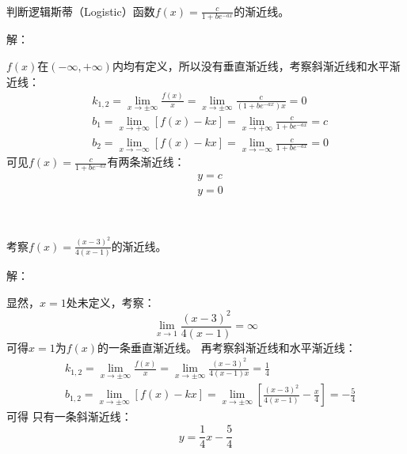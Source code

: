 ~

\begin{example}
判断逻辑斯蒂（Logistic）函数$f\left( x \right) =\frac{c}{1+be^{-ax}}$的渐近线。
\end{example}

解：

$f\left( x \right) $在$\left( -\infty ,+\infty \right) $内均有定义，所以没有垂直渐近线，考察斜渐近线和水平渐近线：
\begin{align*}
&k_{1,2}=\underset{x\rightarrow \pm \infty}{\lim}\frac{f\left( x \right)}{x}=\underset{x\rightarrow \pm \infty}{\lim}\frac{c}{\left( 1+be^{-ax} \right) x}=0 \\
&b_1=\underset{x\rightarrow +\infty}{\lim}\left[ f\left( x \right) -kx \right] =\underset{x\rightarrow +\infty}{\lim}\frac{c}{1+be^{-ax}}=c \\
&b_2=\underset{x\rightarrow -\infty}{\lim}\left[ f\left( x \right) -kx \right] =\underset{x\rightarrow -\infty}{\lim}\frac{c}{1+be^{-ax}}=0
\end{align*}
可见$f\left( x \right) =\frac{c}{1+be^{-ax}}$有两条渐近线：
\begin{align*}
&y=c \\
&y=0
\end{align*}

~

\begin{example}
考察$f\left( x \right) =\frac{\left( x-3 \right) ^2}{4\left( x-1 \right)}$的渐近线。
\end{example}

解：

显然，$x=1$处未定义，考察：
\[
\underset{x\rightarrow 1}{\lim}\frac{\left( x-3 \right) ^2}{4\left( x-1 \right)}=\infty
\]
可得$x=1$为$f\left( x \right) $的一条垂直渐近线。
再考察斜渐近线和水平渐近线：
\begin{align*}
&k_{1,2}=\underset{x\rightarrow \pm \infty}{\lim}\frac{f\left( x \right)}{x}=\underset{x\rightarrow \pm \infty}{\lim}\frac{\left( x-3 \right) ^2}{4\left( x-1 \right) x}=\frac{1}{4} \\
&b_{1,2}=\underset{x\rightarrow \pm \infty}{\lim}\left[ f\left( x \right) -kx \right] =\underset{x\rightarrow \pm \infty}{\lim}\left[ \frac{\left( x-3 \right) ^2}{4\left( x-1 \right)}-\frac{x}{4} \right] =-\frac{5}{4}
\end{align*}
可得 只有一条斜渐近线：
\[
y=\frac{1}{4}x-\frac{5}{4}
\]




